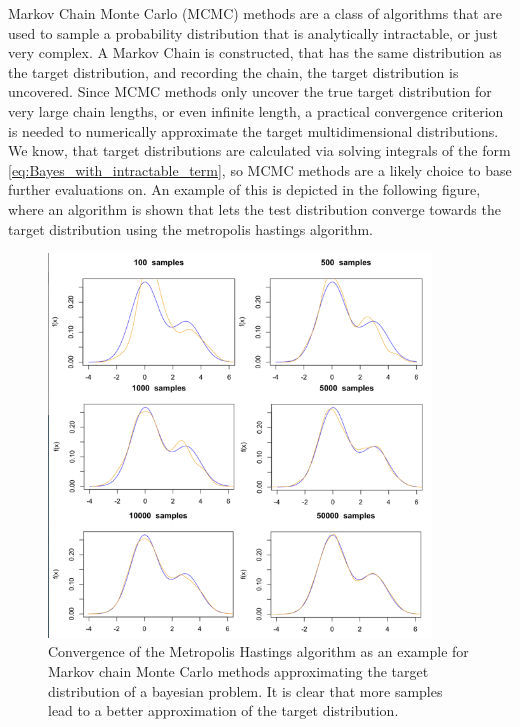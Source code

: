 Markov Chain Monte Carlo (MCMC) methods \cite{Geyer_2011} are a class of algorithms that are used to sample a probability distribution that is analytically intractable, or just very complex. A Markov Chain is constructed, that has the same distribution as the target distribution, and recording the chain, the target distribution is uncovered. Since MCMC methods only uncover the true target distribution for very large chain lengths, or even infinite length, a practical convergence criterion is needed to numerically approximate the target multidimensional distributions. We know, that target distributions are calculated via solving integrals of the form \ref{eq:Bayes_with_intractable_term}, so MCMC methods are a likely choice to base further evaluations on. An example of this is depicted in the following figure, where an algorithm is shown that lets the test distribution converge towards the target distribution using the metropolis hastings algorithm.
\begin{figure}[h!]%
	\centering
	\includegraphics[width=4in]{img/05_6/MetropolisHastingsConvergence.png}
	\caption[Metropolis Hastings Convergence Example]
	{Convergence of the Metropolis Hastings algorithm as an example for Markov chain Monte Carlo methods approximating the target distribution of a bayesian problem. It is clear that more samples lead to a better approximation of the target distribution.}
\end{figure}
